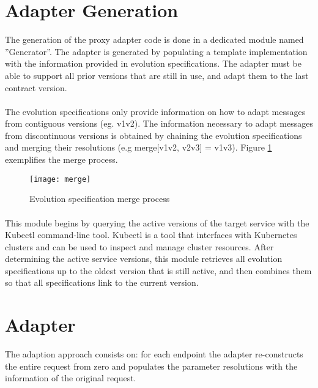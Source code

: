 \section{Adapter Generation} %
\label{sec:adapter_generation}

The generation of the proxy adapter code is done in a dedicated module named ''Generator''.
The adapter is generated by populating a template implementation with the information provided in evolution specifications.
The adapter must be able to support all prior versions that are still in use, and adapt them to the last contract version.

\paragraph{}

The evolution specifications only provide information on how to adapt messages from contiguous versions (eg. v1\textrightarrow v2).
The information necessary to adapt messages from discontinuous versions is obtained by chaining the evolution specifications and
merging their resolutions (e.g merge[v1\textrightarrow v2, v2\textrightarrow v3] = v1\textrightarrow v3).
Figure \ref{fig:merge} exemplifies the merge process.

\begin{figure}[htbp]
    \centering
    \texttt{[image: merge]}
    \caption{Evolution specification merge process}
    \label{fig:merge}
\end{figure}

\paragraph{}

This module begins by querying the active versions of the target service with the Kubectl command-line tool.
Kubectl is a tool that interfaces with Kubernetes clusters and can be used to inspect and manage cluster resources.
After determining the active service versions, this module retrieves all evolution specifications up to the oldest version that is still active,
and then combines them so that all specifications link to the current version.

\section{Adapter} %
\label{sec:adapter}

The adaption approach consists on: for each endpoint the
adapter re-constructs the entire request from zero and populates the parameter resolutions with the information of the original request.

